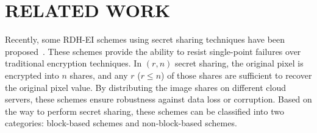 \section{RELATED WORK}
\label{sec:related work}
Recently, some RDH-EI schemes using secret sharing techniques have been proposed~\cite{wu2018adopting, chen2019new, chen_secret_2020, ke2021reversible, qin2021reversible, hua2022matrix, hua_reversible_2023, yu_reversible_2023}. These schemes provide the ability to resist single-point failures over traditional encryption techniques. In $(r,n)$ secret sharing, the original pixel is encrypted into $n$ shares, and any $r$ ($r\leq n$) of those shares are sufficient to recover the original pixel value. By distributing the image shares on different cloud servers, these schemes ensure robustness against data loss or corruption. Based on the way to perform secret sharing, these schemes can be classified into two categories: block-based schemes and non-block-based schemes.

